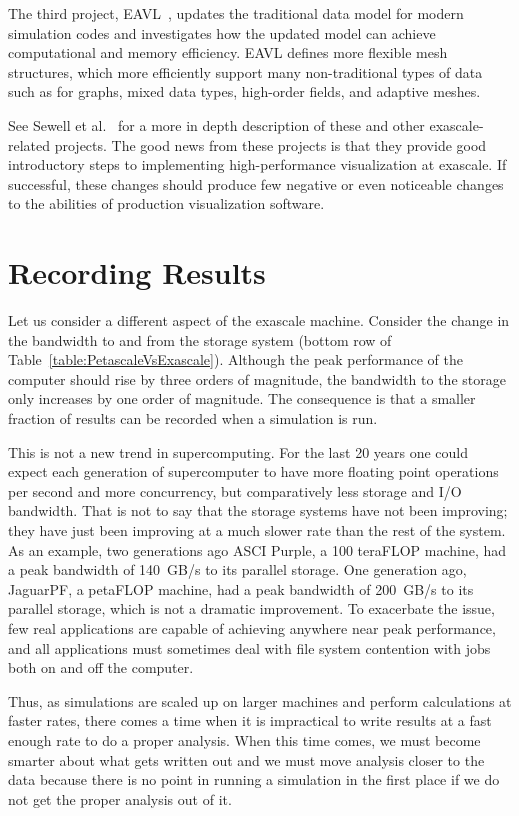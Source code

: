 \documentclass[conference]{IEEEtran}
\newcommand*{\lcite}[1]{~\cite{#1}}
\newcommand*{\scite}[1]{~\cite{#1}}
\newcommand{\etal}{et al.}
\begin{document}
The third project, EAVL\lcite{EAVL}, updates the traditional data model for
modern simulation codes and investigates how the updated model can achieve
computational and memory efficiency.  EAVL defines more flexible mesh
structures, which more efficiently support many non-traditional types of
data such as for graphs, mixed data types, high-order fields, and adaptive
meshes.

See Sewell \etal\scite{Sewell2012} for a more in depth description of these
and other exascale-related projects.  The good news from these projects is
that they provide good introductory steps to implementing high-performance
visualization at exascale.  If successful, these changes should produce few
negative or even noticeable changes to the abilities of production
visualization software.

\section{Recording Results}
\label{sec:RecordingResults}

\noindent
Let us consider a different aspect of the exascale machine.  Consider the
change in the bandwidth to and from the storage system (bottom row of
Table~\ref{table:PetascaleVsExascale}).  Although the peak performance of
the computer should rise by three orders of magnitude, the bandwidth to the
storage only increases by one order of magnitude.  The consequence is that
a smaller fraction of results can be recorded when a simulation is run.

This is not a new trend in supercomputing.  For the last 20 years one could
expect each generation of supercomputer to have more floating point
operations per second and more concurrency, but comparatively less storage
and I/O bandwidth.  That is not to say that the storage systems have not
been improving; they have just been improving at a much slower rate than
the rest of the system.  As an example, two generations ago ASCI Purple, a
100 teraFLOP machine, had a peak bandwidth of 140~GB/s to its parallel
storage.  One generation ago, JaguarPF, a petaFLOP machine, had a peak
bandwidth of 200~GB/s to its parallel storage, which is not a dramatic
improvement.  To exacerbate the issue, few real applications are capable of
achieving anywhere near peak performance, and all applications must
sometimes deal with file system contention with jobs both on and off the
computer.

Thus, as simulations are scaled up on larger machines and perform
calculations at faster rates, there comes a time when it is impractical to
write results at a fast enough rate to do a proper analysis.  When this
time comes, we must become smarter about what gets written out and we must
move analysis closer to the data because there is no point in running a
simulation in the first place if we do not get the proper analysis out of
it.
\end{document}
